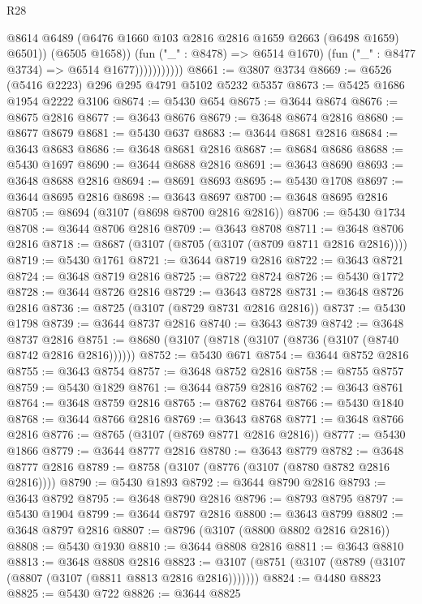 \begin{lexlean}{R28}
\begin{coremodule}
                            @8614
                            @6489
                            (@6476 @1660 @103 @2816 @2816 @1659 @2663 (@6498 @1659) @6501))
                          (@6505 @1658))
                        (fun ("_" : @8478) => @6514 @1670)
                        (fun ("_" : @8477 @3734) => @6514 @1677)))))))))))
@8661 := @3807 @3734
@8669 := @6526 (@5416 @2223) @296 @295 @4791 @5102 @5232 @5357
@8673 := @5425 @1686 @1954 @2222 @3106
@8674 := @5430 @654
@8675 := @3644 @8674
@8676 := @8675 @2816
@8677 := @3643 @8676
@8679 := @3648 @8674 @2816
@8680 := @8677 @8679
@8681 := @5430 @637
@8683 := @3644 @8681 @2816
@8684 := @3643 @8683
@8686 := @3648 @8681 @2816
@8687 := @8684 @8686
@8688 := @5430 @1697
@8690 := @3644 @8688 @2816
@8691 := @3643 @8690
@8693 := @3648 @8688 @2816
@8694 := @8691 @8693
@8695 := @5430 @1708
@8697 := @3644 @8695 @2816
@8698 := @3643 @8697
@8700 := @3648 @8695 @2816
@8705 := @8694 (@3107 (@8698 @8700 @2816 @2816))
@8706 := @5430 @1734
@8708 := @3644 @8706 @2816
@8709 := @3643 @8708
@8711 := @3648 @8706 @2816
@8718 := @8687 (@3107 (@8705 (@3107 (@8709 @8711 @2816 @2816))))
@8719 := @5430 @1761
@8721 := @3644 @8719 @2816
@8722 := @3643 @8721
@8724 := @3648 @8719 @2816
@8725 := @8722 @8724
@8726 := @5430 @1772
@8728 := @3644 @8726 @2816
@8729 := @3643 @8728
@8731 := @3648 @8726 @2816
@8736 := @8725 (@3107 (@8729 @8731 @2816 @2816))
@8737 := @5430 @1798
@8739 := @3644 @8737 @2816
@8740 := @3643 @8739
@8742 := @3648 @8737 @2816
@8751 := @8680 (@3107 (@8718 (@3107 (@8736 (@3107 (@8740 @8742 @2816 @2816))))))
@8752 := @5430 @671
@8754 := @3644 @8752 @2816
@8755 := @3643 @8754
@8757 := @3648 @8752 @2816
@8758 := @8755 @8757
@8759 := @5430 @1829
@8761 := @3644 @8759 @2816
@8762 := @3643 @8761
@8764 := @3648 @8759 @2816
@8765 := @8762 @8764
@8766 := @5430 @1840
@8768 := @3644 @8766 @2816
@8769 := @3643 @8768
@8771 := @3648 @8766 @2816
@8776 := @8765 (@3107 (@8769 @8771 @2816 @2816))
@8777 := @5430 @1866
@8779 := @3644 @8777 @2816
@8780 := @3643 @8779
@8782 := @3648 @8777 @2816
@8789 := @8758 (@3107 (@8776 (@3107 (@8780 @8782 @2816 @2816))))
@8790 := @5430 @1893
@8792 := @3644 @8790 @2816
@8793 := @3643 @8792
@8795 := @3648 @8790 @2816
@8796 := @8793 @8795
@8797 := @5430 @1904
@8799 := @3644 @8797 @2816
@8800 := @3643 @8799
@8802 := @3648 @8797 @2816
@8807 := @8796 (@3107 (@8800 @8802 @2816 @2816))
@8808 := @5430 @1930
@8810 := @3644 @8808 @2816
@8811 := @3643 @8810
@8813 := @3648 @8808 @2816
@8823 := @3107 (@8751 (@3107 (@8789 (@3107 (@8807 (@3107 (@8811 @8813 @2816 @2816)))))))
@8824 := @4480 @8823
@8825 := @5430 @722
@8826 := @3644 @8825

\end{coremodule}
\end{lexlean}
